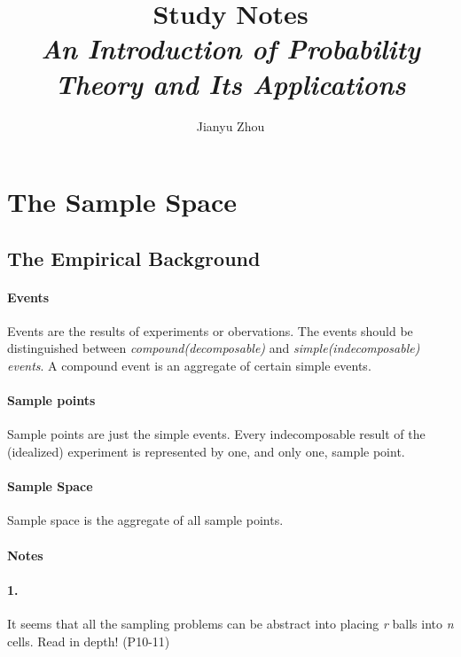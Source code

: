 \documentclass{article}
\author{Jianyu Zhou}
\title{\textbf{Study Notes}\\ \textit{An Introduction of Probability Theory and Its Applications}}
\begin{document}
	\maketitle
	\section{The Sample Space}
	\subsection{The Empirical Background}
	\paragraph{Events} Events are the results of experiments or obervations.
	The events should be distinguished between \textit{compound(decomposable)} and \textit{simple(indecomposable) events}. A compound event is an aggregate of certain simple events.
	\paragraph{Sample points} Sample points are just the simple events. Every indecomposable result of the (idealized) experiment is represented by one, and only one, sample point.
	\paragraph{Sample Space} Sample space is the aggregate of all sample points.
	\paragraph{Notes}
	\paragraph{1.} It seems that all the sampling problems can be abstract into placing \textit{r} balls into \textit{n} cells. Read in depth! (P10-11)
\end{document}
